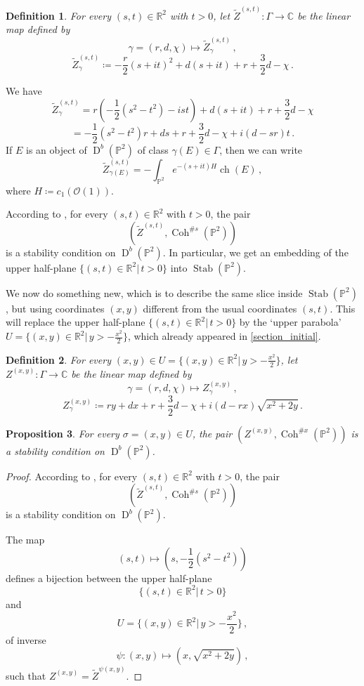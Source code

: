 \documentclass[12pt, a4paper]{amsart}
\newtheorem{defn}{Definition}[section]
\newtheorem{prop}[defn]{Proposition}
\newcommand\C{\mathbb C}
\newcommand\PP{\mathbb P}
\newcommand\R{\mathbb R}
\newcommand\cO{\mathcal O}
\newcommand\Coh{\operatorname{Coh}}
\newcommand\ch{\operatorname{ch}}
\newcommand\Stab{\operatorname{Stab}}
\newcommand\D{\operatorname{D}}
\begin{document}
\begin{defn}
For every $(s,t) \in \R^2$ with $t>0$, let $\tilde{Z}^{(s,t)} \colon \Gamma \rightarrow \C$
be the linear map defined by
\[\gamma = (r,d,\chi) \mapsto \tilde{Z}_\gamma^{(s,t)} \,,\]
  \[  \tilde{Z}_\gamma^{(s,t)}\coloneq -\frac{r}{2}(s+it)^2  +d(s+it)+r+\frac{3}{2}d-\chi\,. \]
\end{defn}

We have
\[  \tilde{Z}_\gamma^{(s,t)}=r \left( -\frac{1}{2}(s^2-t^2)-ist \right)  +d (s+it)+r+\frac{3}{2}d-\chi\]
\[= -\frac{1}{2}(s^2-t^2)r+ds+r+\frac{3}{2}d-\chi + i(d-sr)t\,.\]
If $E$ is an object of $\D^b(\PP^2)$ of class $\gamma(E) \in \Gamma$, then we can write
\[\tilde{Z}_{\gamma(E)}^{(s,t)}=-\int_{\PP^2}
e^{-(s+it)H} \ch(E)\,,\]
where $H \coloneq c_1(\cO(1))$.


According to \cite{MR2376815, MR2998828, MR2852118}, for every 
$(s,t) \in \R^2$ with $t>0$, the pair 
\[ (\tilde{Z}^{(s,t)}, \Coh^{\texttt{\#} s}(\PP^2))\] is a stability condition on
$\D^b(\PP^2)$. In particular, we get
an embedding of the upper half-plane 
$\{(s,t) \in \R^2|\, t>0\}$ into 
$\Stab(\PP^2)$.

We now do something new, which is to describe the same slice inside $\Stab(\PP^2)$, but using coordinates $(x,y)$ different from the usual coordinates $(s,t)$. This will replace the upper half-plane 
$\{(s,t) \in \R^2|\,t>0\}$ by the 
`upper parabola' $U=\{(x,y) \in \R^2|\,y>-\frac{x^2}{2}\}$, which already appeared in  \cref{section_initial}.

\begin{defn} \label{def_central_charge_formula}
For every $(x,y) \in U =\{(x,y) \in \R^2| \,y>-\frac{x^2}{2}\}$,
let $Z^{(x,y)} \colon \Gamma \rightarrow \C$ be the linear map defined by 
\[\gamma = (r,d,\chi) \mapsto Z_\gamma^{(x,y)} \,,\]
\[Z_\gamma^{(x,y)} \coloneqq r y 
+dx
+r+\frac{3}{2}d-\chi
+i
(d-rx)\sqrt{x^2+2y}\,.\]
\end{defn}


\begin{prop} \label{prop_stability}
For every $\sigma=(x,y) \in U$, the pair 
$(Z^{(x,y)}, \Coh^{\texttt{\#}x}(\PP^2))$
is a stability condition on $\D^b(\PP^2)$.
\end{prop}

\begin{proof}

According to \cite{MR2376815, MR2998828, MR2852118}, for every $(s,t) \in \R^2$ with $t >0$, the pair 
\[(\tilde{Z}^{(s,t)}, \Coh^{\texttt{\#} s}(\PP^2))\]
is a stability condition on $\D^b(\PP^2)$.

The map 
\[(s,t) \mapsto  (s,-\frac{1}{2}(s^2-t^2))\]
defines a bijection between the upper half-plane 
\[\{(s,t) \in \R^2|\,t>0\}\] and 
\[U
=\{(x,y) \in \R^2|\,y>-\frac{x^2}{2}\}\,,\]
of inverse 
\[\psi \colon (x,y) \mapsto (x, \sqrt{x^2+2y})\,,\]
such that $Z^{(x,y)}=\tilde{Z}^{\psi(x,y)}$. 
\end{proof}
\end{document}

